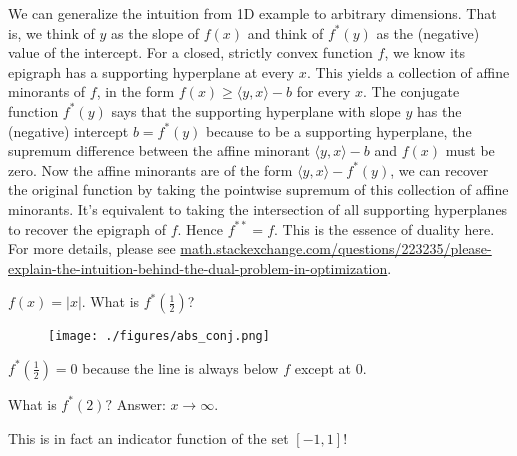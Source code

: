\documentclass[class=article,crop=false]{standalone}
\begin{document}
\begin{remark}\label{conj-func-intuit}
	We can generalize the intuition from 1D example to arbitrary dimensions. That is, we think of $y$ as the slope of $f(x)$ and think of $f^* (y)$ as the (negative) value of the intercept. For a closed, strictly convex function $f$, we know its epigraph has a supporting hyperplane at every $ x$. This yields a collection of affine minorants of $ f$, in the form $ f(x) \geq \langle y,x \rangle - b$ for every $ x$. The conjugate function $ f^* (y)$ says that the supporting hyperplane with slope $ y$ has the (negative) intercept $ b=f^* (y)$ because to be a supporting hyperplane, the supremum difference between the affine minorant $\langle y,x \rangle -b $ and $ f(x)$ must be zero. Now the affine minorants are of the form $ \langle y,x \rangle - f^* (y)$, we can recover the original function by taking the pointwise supremum of this collection of affine minorants. It's equivalent to taking the intersection of all supporting hyperplanes to recover the epigraph of $ f$. Hence $ f^{* *}=f$. This is the essence of duality here. For more details, please see \url{math.stackexchange.com/questions/223235/please-explain-the-intuition-behind-the-dual-problem-in-optimization}.
\end{remark}

\begin{eg}
	$ f(x) = |x|$. What is  $ f^* \left( \frac{1}{2} \right) $?
	~\begin{figure}[H]
		\centering
		\texttt{[image: ./figures/abs\_conj.png]}
	\end{figure}

	$ f^* \left( \frac{1}{2} \right) = 0$ because the line is always below $ f$ except at 0.

	What is $ f^* (2)?$ Answer: $ x \to \infty$.

	This is in fact an indicator function of the set $ [-1,1]$!
\end{eg}
\end{document}
